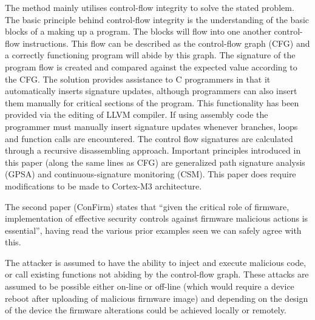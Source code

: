 The method mainly utilises control-flow integrity to solve the stated problem. The basic principle behind control-flow integrity is the understanding of the basic blocks of a making up a program. The blocks will flow into one another control-flow instructions. This flow can be described as the control-flow graph (CFG) and a correctly functioning program will abide by this graph. The signature of the program flow is created and compared against the expected value according to the CFG. The solution provides assistance to C programmers in that it automatically inserts signature updates, although programmers can also insert them manually for critical sections of the program. This functionality has been provided via the editing of LLVM compiler. If using assembly code the programmer must manually insert signature updates whenever branches, loops and function calls are encountered. The control flow signatures are calculated through a  recursive disassembling approach. Important principles introduced in this paper (along the same lines as CFG) are generalized path signature analysis (GPSA) and continuous-signature monitoring (CSM). This paper does require modifications to be made to Cortex-M3 architecture.

\ifnotesincluded
{} 


\fi

The second paper \cite{Wang2016} (ConFirm) states that ``given the critical role of firmware, implementation of effective security controls against firmware malicious actions is essential'', having read the various prior examples seen we can safely agree with this. 

The attacker is assumed to have the ability to inject and execute malicious code, or call existing functions not abiding by the control-flow graph. These attacks are assumed to be possible either on-line or off-line (which would require a device reboot after uploading of malicious firmware image) and depending on the design of the device the firmware alterations could be achieved locally or remotely.

